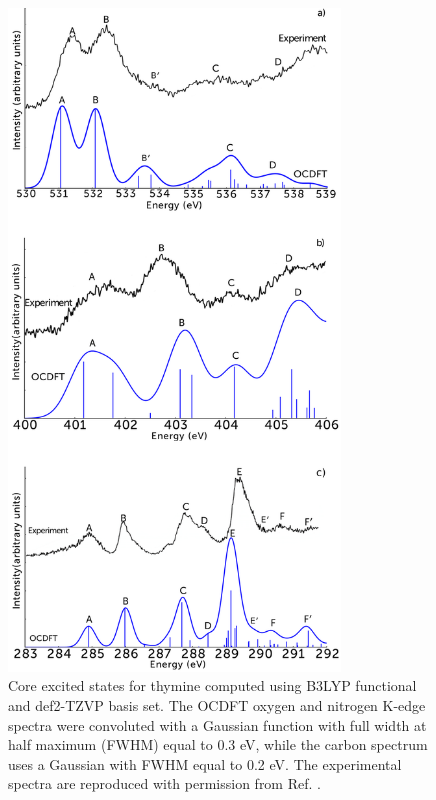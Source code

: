 \documentclass[12pt]{article}
\begin{document}
  \begin{figure}[!t]
\centering
\includegraphics[width=8.8cm]{figure_7.png}
\caption{Core excited states for thymine computed using B3LYP functional and def2-TZVP basis set. The OCDFT oxygen and nitrogen K-edge spectra were convoluted with a Gaussian function with full width at half maximum (FWHM) equal to 0.3 eV, while the carbon spectrum uses a Gaussian with FWHM equal to 0.2 eV. The experimental spectra are reproduced with permission from Ref. .}
\label{figure:Thymine}
\end{figure}
\end{document}
